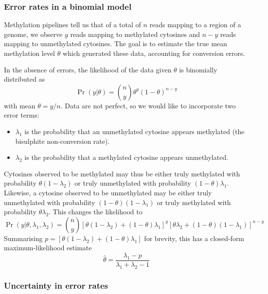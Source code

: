 \documentclass[12pt,longbibliography]{article}
\begin{document}
\subsubsection{Error rates in a binomial model}

Methylation pipelines tell us that of a total of $n$ reads mapping to a region of a genome, we observe $y$ reads mapping to methylated cytosines and $n-y$ reads mapping to unmethylated cytosines. The goal is to estimate the true mean methylation level $\theta$ which generated these data, accounting for conversion errors.

In the absence of errors, the likelihood of the data given $\theta$ is binomially distributed as
\begin{equation}
    \label{eqn:classic-binomial}
    \Pr(y| \theta) = {n \choose y} \theta^y(1-\theta)^{n-y}
\end{equation}
with mean $\theta=y/n$.
Data are not perfect, so we would like to incorporate two error terms:
\begin{itemize}
    \item $\lambda_1$ is the probability that an unmethylated cytosine appears methylated (the bisulphite non-conversion rate).
    \item $\lambda_2$ is the probability that a methylated cytosine appears unmethylated.
\end{itemize}
Cytosines observed to be methylated may thus be either truly methylated with probability $\theta(1-\lambda_2)$ or truly unmethylated with probability $(1-\theta)\lambda_1$. Likewise, a cytosine observed to be unmethylated may be either truly unmethylated with probability $(1-\theta)(1-\lambda_1)$ or truly methylated with probability $\theta \lambda_2$.
This changes the likelihood to
\begin{equation}
    \label{eqn:binom-with-errors}
    \Pr(y | \theta, \lambda_1, \lambda_2) = 
    {n \choose y}
    [\theta(1-\lambda_2) + (1-\theta)\lambda_1]^y
    [\theta \lambda_2 + (1-\theta)(1-\lambda_1)]^{n-y}
\end{equation}
Summarising $p=[\theta(1-\lambda_2) + (1-\theta)\lambda_1]$ for brevity, this has a closed-form maximum-likelihood estimate
\begin{equation}
    \label{eqn:ml-theta}
    \hat{\theta} = \frac{\lambda_1-p}{\lambda_1 + \lambda_2 -1}
\end{equation}

\subsubsection{Uncertainty in error rates}
\end{document}
